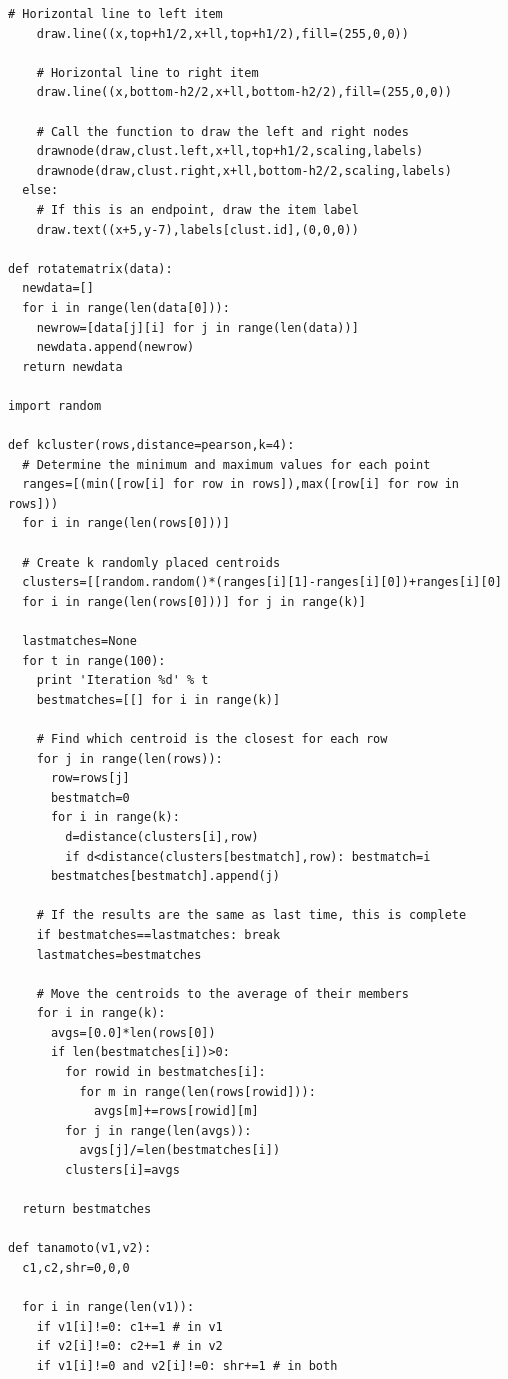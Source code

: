 \documentclass{article}
\begin{document}
\begin{lstlisting}[frame=single, caption=clusters.py, label=clusters]
    # Horizontal line to left item
    draw.line((x,top+h1/2,x+ll,top+h1/2),fill=(255,0,0))    

    # Horizontal line to right item
    draw.line((x,bottom-h2/2,x+ll,bottom-h2/2),fill=(255,0,0))        

    # Call the function to draw the left and right nodes    
    drawnode(draw,clust.left,x+ll,top+h1/2,scaling,labels)
    drawnode(draw,clust.right,x+ll,bottom-h2/2,scaling,labels)
  else:   
    # If this is an endpoint, draw the item label
    draw.text((x+5,y-7),labels[clust.id],(0,0,0))

def rotatematrix(data):
  newdata=[]
  for i in range(len(data[0])):
    newrow=[data[j][i] for j in range(len(data))]
    newdata.append(newrow)
  return newdata

import random

def kcluster(rows,distance=pearson,k=4):
  # Determine the minimum and maximum values for each point
  ranges=[(min([row[i] for row in rows]),max([row[i] for row in rows])) 
  for i in range(len(rows[0]))]

  # Create k randomly placed centroids
  clusters=[[random.random()*(ranges[i][1]-ranges[i][0])+ranges[i][0] 
  for i in range(len(rows[0]))] for j in range(k)]
  
  lastmatches=None
  for t in range(100):
    print 'Iteration %d' % t
    bestmatches=[[] for i in range(k)]
    
    # Find which centroid is the closest for each row
    for j in range(len(rows)):
      row=rows[j]
      bestmatch=0
      for i in range(k):
        d=distance(clusters[i],row)
        if d<distance(clusters[bestmatch],row): bestmatch=i
      bestmatches[bestmatch].append(j)

    # If the results are the same as last time, this is complete
    if bestmatches==lastmatches: break
    lastmatches=bestmatches
    
    # Move the centroids to the average of their members
    for i in range(k):
      avgs=[0.0]*len(rows[0])
      if len(bestmatches[i])>0:
        for rowid in bestmatches[i]:
          for m in range(len(rows[rowid])):
            avgs[m]+=rows[rowid][m]
        for j in range(len(avgs)):
          avgs[j]/=len(bestmatches[i])
        clusters[i]=avgs
      
  return bestmatches

def tanamoto(v1,v2):
  c1,c2,shr=0,0,0
  
  for i in range(len(v1)):
    if v1[i]!=0: c1+=1 # in v1
    if v2[i]!=0: c2+=1 # in v2
    if v1[i]!=0 and v2[i]!=0: shr+=1 # in both
  

\end{lstlisting}
\end{document}
